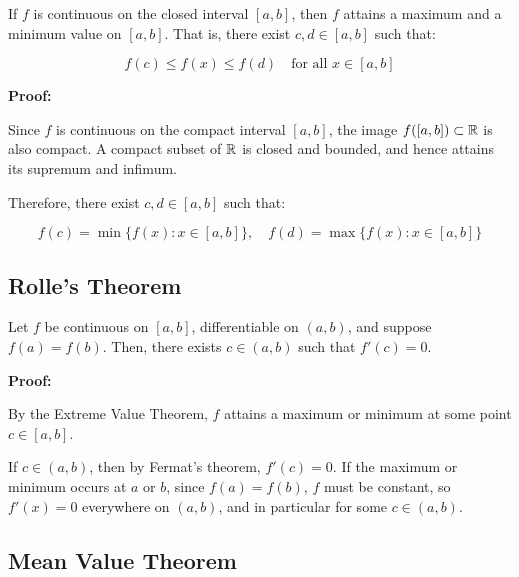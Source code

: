 If \(f\) is continuous on the closed interval \([a, b] \), then \(f\) attains a maximum and a 
minimum value on \([a, b]\). That is, there exist \( c, d \in [a, b] \) such that:

\[
    f(c) \le f(x) \le f(d) \quad \text{for all } x \in [a, b]
\]

\textbf{Proof:}  

Since \(f\) is continuous on the compact interval \([a, b]\), the image \( f([a, b]) \subset \mathbb{R} \) 
is also compact. A compact subset of \( \mathbb{R} \) is closed and bounded, and hence 
attains its supremum and infimum.

Therefore, there exist \( c, d \in [a, b] \) such that:

\[
    f(c) = \min\{f(x): x \in [a, b]\}, \quad
    f(d) = \max\{f(x): x \in [a, b]\}
\]

\QED

\subsection{Rolle’s Theorem}
Let \(f\) be continuous on \([a, b] \), differentiable on \((a, b) \), and suppose \( f(a) = f(b) \).  
Then, there exists \( c \in (a, b) \) such that \( f'(c) = 0 \).

\textbf{Proof:}  

By the Extreme Value Theorem, \(f\) attains a maximum or minimum at some point \( c \in [a, b] \).

If \( c \in (a, b) \), then by Fermat’s theorem, \( f'(c) = 0 \).  
If the maximum or minimum occurs at \(a\) or \(b\), since \( f(a) = f(b) \), \(f\) must be 
constant, so \( f'(x) = 0 \) everywhere on \((a, b)\), and in particular for some \( c \in (a, b) \).

\QED

\begin{center}
\end{center}

\subsection{Mean Value Theorem}

